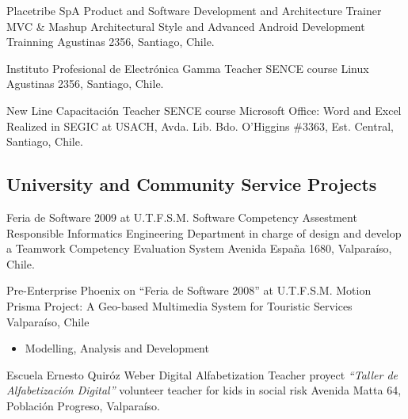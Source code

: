 	{Placetribe SpA} %
	{Product and Software Development and Architecture Trainer} %
	{} %
	{MVC \& Mashup Architectural Style and Advanced Android Development Trainning}
    	{Agustinas 2356, Santiago, Chile.}

	{Instituto Profesional de Electrónica Gamma} %
	{Teacher} %
	{SENCE course} %
	{Linux}
    	{Agustinas 2356, Santiago, Chile.}
	
	{New Line Capacitación} %
	{Teacher} %
	{SENCE course} %
	{Microsoft Office: Word and Excel}
	{Realized in SEGIC at USACH, Avda. Lib. Bdo. O'Higgins \#3363, Est.
    Central, Santiago, Chile.}
	

	

	
	
\subsection{University and Community Service Projects}

	{Feria de Software 2009 at U.T.F.S.M.}
	{Software Competency Assestment Responsible}
	{Informatics Engineering Department}
	{in charge of design and develop a Teamwork Competency Evaluation
System}
	{Avenida Espa\~na 1680,  Valpara\'iso, Chile.}

	{Pre-Enterprise Phoenix on ``Feria de Software 2008'' at U.T.F.S.M.}
	{Motion Prisma Project: A Geo-based Multimedia System for Touristic
Services}
	{Valparaíso, Chile}{}
	{\begin{itemize}
		\item Modelling, Analysis and Development 
	\end{itemize}}
	
%

	{Escuela Ernesto Quir\'oz Weber}
	{Digital Alfabetization Teacher}
	{proyect \textit{``Taller de Alfabetizaci\'on Digital''}}
	{volunteer teacher for kids in social risk}
	{Avenida Matta 64, Poblaci\'on Progreso, Valpara\'iso.}
 

